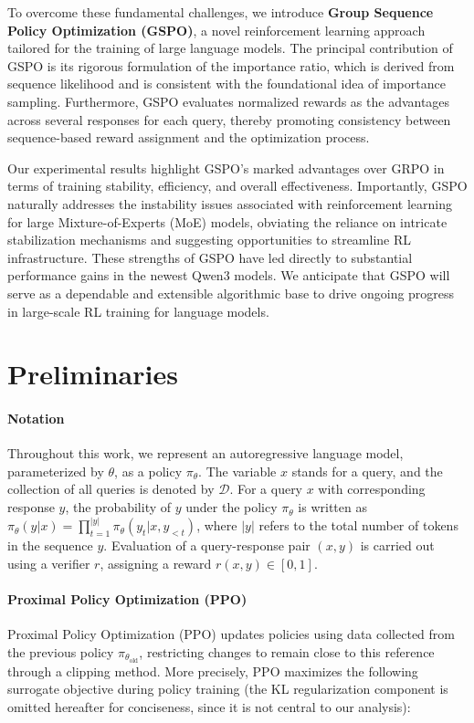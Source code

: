 To overcome these fundamental challenges, we introduce \textbf{Group Sequence Policy Optimization (GSPO)}, a novel reinforcement learning approach tailored for the training of large language models. The principal contribution of GSPO is its rigorous formulation of the importance ratio, which is derived from sequence likelihood \citep{click} and is consistent with the foundational idea of importance sampling. Furthermore, GSPO evaluates normalized rewards as the advantages across several responses for each query, thereby promoting consistency between sequence-based reward assignment and the optimization process.

Our experimental results highlight GSPO’s marked advantages over GRPO in terms of training stability, efficiency, and overall effectiveness. Importantly, GSPO naturally addresses the instability issues associated with reinforcement learning for large Mixture-of-Experts (MoE) models, obviating the reliance on intricate stabilization mechanisms and suggesting opportunities to streamline RL infrastructure. These strengths of GSPO have led directly to substantial performance gains in the newest Qwen3 models. We anticipate that GSPO will serve as a dependable and extensible algorithmic base to drive ongoing progress in large-scale RL training for language models.

\section{Preliminaries}

\paragraph{Notation}
Throughout this work, we represent an autoregressive language model, parameterized by $\theta$, as a policy $\pi_\theta$. The variable $x$ stands for a query, and the collection of all queries is denoted by $\mathcal{D}$. For a query $x$ with corresponding response $y$, the probability of $y$ under the policy $\pi_\theta$ is written as $\pi_\theta (y | x)=\prod_{t=1}^{|y|} \pi_\theta (y_t | x, y_{<t} )$, where $|y|$ refers to the total number of tokens in the sequence $y$. Evaluation of a query-response pair $(x, y)$ is carried out using a verifier $r$, assigning a reward $r(x, y) \in [0, 1]$.

\paragraph{Proximal Policy Optimization (PPO)} Proximal Policy Optimization (PPO) \citep{ppo} updates policies using data collected from the previous policy $\pi_{\theta_\text{old}}$, restricting changes to remain close to this reference through a clipping method. More precisely, PPO maximizes the following surrogate objective during policy training (the KL regularization component is omitted hereafter for conciseness, since it is not central to our analysis):

